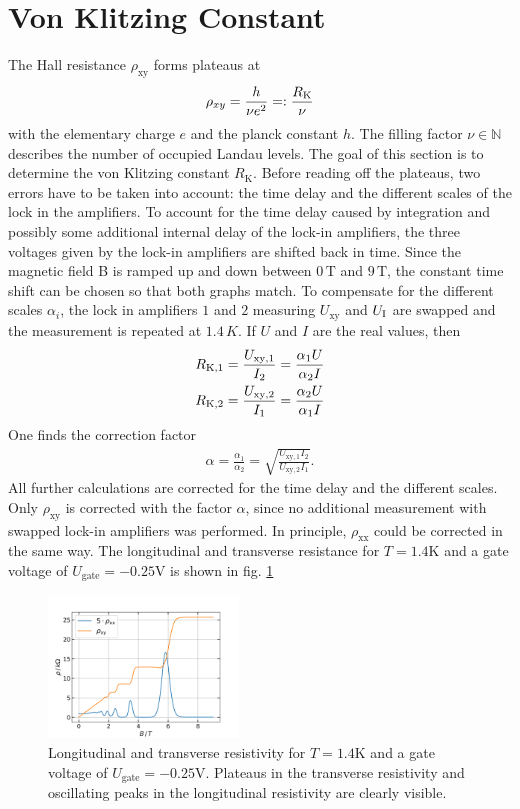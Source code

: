 \section{Von Klitzing Constant}

The Hall resistance $\rho_{\text{xy}}$ forms plateaus at \begin{align}
    \rho_{xy} = \frac{h}{\nu e^2} =: \frac{R_\text K}{\nu} \end{align} with the elementary charge $e$ and the planck constant $h$. 
The filling factor $\nu \in \mathbb N$ describes the number of occupied Landau levels.
The goal of this section is to determine the von Klitzing constant $R_\text{K}$.
Before reading off the plateaus, two errors have to be taken into account: the time delay and the different scales of the lock in the amplifiers.
To account for the time delay caused by integration and possibly some additional internal delay of the lock-in amplifiers, the three voltages given by the lock-in amplifiers are shifted back in time.
Since the magnetic field B is ramped up and down between $0\,\text{T}$ and $9\,\text{T}$, the constant time shift can be chosen so that both graphs match.
To compensate for the different scales $\alpha_i$, the lock in amplifiers $1$ and $2$ measuring $U_\text{xy}$ and $U_\text I$ are swapped and the measurement is repeated at $1.4\,K$.
If $U$ and $I$ are the real values, then 
\begin{align}
    R_{\text K,1} = \frac{U_{\text{xy}, 1}}{I_2} = \frac{\alpha_1 U}{\alpha_2 I}\\ R_{\text K,2} = \frac{U_{\text{xy}, 2}}{I_1} = \frac{\alpha_2 U}{\alpha_1 I}
\end{align} 
One finds the correction factor 
\begin{align}
    \alpha = \frac{\alpha_1}{\alpha_2} = \sqrt{\frac{U_{\text{xy},1}I_2}{U_{\text{xy}, 2}I_1}}. 
\end{align}
All further calculations are corrected for the time delay and the different scales.
Only $\rho_{\text{xy}}$ is corrected with the factor $\alpha$, since no additional measurement with swapped lock-in amplifiers was performed.
In principle, $\rho_{\text{xx}}$ could be corrected in the same way.
The longitudinal and transverse resistance for $T=1.4\text{K}$ and a gate voltage of $U_\text{gate}=-0.25\text{V}$ is shown in fig. \ref{fig:KlitzingBeispielBild} \begin{figure}[h] \centering \includegraphics[width=0.45\textwidth]{../Images/BeispielBildVomAnfang.png}
    \caption{ Longitudinal and transverse resistivity for $T=1.4\text{K}$ and a gate voltage of $U_\text{gate}=-0.25\text{V}$.
        Plateaus in the transverse resistivity and oscillating peaks in the longitudinal resistivity are clearly visible.
        }
    \label{fig:KlitzingBeispielBild} 
\end{figure}

